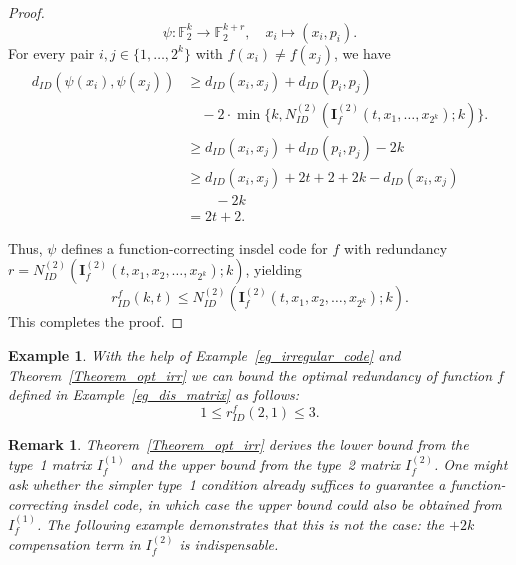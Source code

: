 \documentclass[11 pt]{article}
\numberwithin{equation}{section}
\newtheorem{example}[theorem]{Example}
\newtheorem{remark}[theorem]{Remark}
\begin{document}
\begin{proof}
\begin{sloppypar}
        \end{sloppypar}
        \[
        \psi: \mathbb{F}_2^k \to \mathbb{F}_2^{k+r}, \quad {x_i} \mapsto ({x_i}, {p_i}).
        \]  
        For every pair \( i, j \in \{1, \ldots, 2^k\} \) with \( f({x_i}) \neq f({x_j}) \), we have  
        \begin{align*}
        d_{ID}(\psi({x_i}), \psi({x_j})) &\geq d_{ID}({x_i}, {x_j}) + d_{ID}({p_i}, {p_j}) \\& \quad -2\cdot \min\{k, N^{(2)}_{ID} (\boldsymbol{I}_f^{(2)}(t,  x_1, \ldots,x_{2^k});k) \}.\\
        &\geq d_{ID}({x_i}, {x_j}) + d_{ID}({p_i}, {p_j}) - 2k\\
        & \geq d_{ID}({x_i}, {x_j}) + 2t + 2 + 2k - d_{ID}({x_i}, {x_j})\\&\qquad -2k\\
        &= 2t + 2.
        \end{align*}
        
        Thus, \( \psi \) defines a function-correcting insdel code for \( f \) with redundancy \( r = N^{(2)}_{ID}(\boldsymbol{I}_f^{(2)}(t,  x_1,x_2, \ldots,x_{2^k});k) \), yielding  
        \[
        r^f_{ID}(k, t) \leq N^{(2)}_{ID}(\boldsymbol{I}_f^{(2)}(t,  x_1,x_2, \ldots,x_{2^k});k).
        \]        
        This completes the proof.  
    \end{proof}

    \begin{example}
        With the help of Example~\ref{eg_irregular_code} and Theorem~\ref{Theorem_opt_irr} we can bound the optimal redundancy of function $f$ defined in Example~\ref{eg_dis_matrix} as follows:
        \[
            1 \leq r_{ID}^f(2,1) \leq 3.
        \]
    \end{example}

    
    \begin{remark}
    Theorem~\ref{Theorem_opt_irr} derives the lower bound from the type~1 matrix $I^{(1)}_f$ and the upper bound from the type~2 matrix $I^{(2)}_f$. One might ask whether the simpler type~1 condition already suffices to guarantee a function-correcting insdel code, in which case the upper bound could also be obtained from $I^{(1)}_f$. The following example demonstrates that this is not the case: the $+2k$ compensation term in $I^{(2)}_f$ is indispensable.
    \end{remark}
\end{document}
